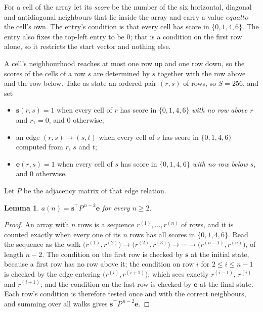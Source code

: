 \documentclass[11pt,a4paper]{article}
\theoremstyle{plain}
\newtheorem{lemma}[theorem]{Lemma}
\theoremstyle{definition}
\begin{document}
For a cell of the array let its \emph{score} be the number of the six horizontal, diagonal and antidiagonal neighbours that lie inside
the array and carry a value $equal to$ the cell's own. The entry's condition is that every cell
has score in $\{0,1,4,6\}$. The entry also fixes the top-left entry to be $0$; that is a condition on the first row alone, so it restricts the start vector and nothing else.

A cell's neighbourhood reaches at most one row up and one row down, so the scores of the
cells of a row $s$ are determined by $s$ together with the row above and the row below.
Take as state an ordered pair $(r,s)$ of rows, so $S=256$, and set
\begin{itemize}
\item $\mathbf{s}(r,s)=1$ when every cell of $r$ has score in $\{0,1,4,6\}$ \emph{with no row
above $r$} and $r_1=0$, and $0$ otherwise;
\item an edge $(r,s)\to(s,t)$ when every cell of $s$ has score in $\{0,1,4,6\}$ computed from
$r$, $s$ and $t$;
\item $\mathbf{e}(r,s)=1$ when every cell of $s$ has score in $\{0,1,4,6\}$ \emph{with no row
below $s$}, and $0$ otherwise.
\end{itemize}
Let $P$ be the adjacency matrix of that edge relation.

\begin{lemma}\label{lem:walk}
$a(n)=\mathbf{s}^{\!\top}P^{\,n-2}\mathbf{e}$ for every $n\ge2$.
\end{lemma}

\begin{proof}
An array with $n$ rows is a sequence $r^{(1)},\dots,r^{(n)}$ of rows, and it is counted
exactly when every one of its $n$ rows has all scores in $\{0,1,4,6\}$. Read the sequence as the
walk $\bigl(r^{(1)},r^{(2)}\bigr)\to\bigl(r^{(2)},r^{(3)}\bigr)\to\cdots\to
\bigl(r^{(n-1)},r^{(n)}\bigr)$, of length $n-2$. The condition on the first row is
checked by $\mathbf{s}$ at the initial state, because a first row has no row above it; the
condition on row $i$ for $2\le i\le n-1$ is checked by the edge entering
$\bigl(r^{(i)},r^{(i+1)}\bigr)$, which sees exactly $r^{(i-1)}$, $r^{(i)}$ and
$r^{(i+1)}$; and the condition on the last row is checked by $\mathbf{e}$ at the final
state. Each row's condition is therefore tested once and with the correct neighbours, and
summing over all walks gives $\mathbf{s}^{\!\top}P^{\,n-2}\mathbf{e}$.
\end{proof}
\end{document}
